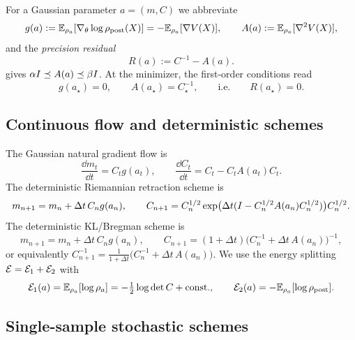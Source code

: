 For a Gaussian parameter $a=(m,C)$ we abbreviate
\[
    g(a):=\mathbb{E}_{\rho_a}[\nabla_\theta\log\rho_{\mathrm{post}}(X)]
    =-\mathbb{E}_{\rho_a}[\nabla V(X)],
    \qquad
    A(a):=\mathbb{E}_{\rho_a}[\nabla^2V(X)],
\]
and the \emph{precision residual}
\[
    R(a):=C^{-1}-A(a).
\]
 gives $\alpha I\preceq A(a)\preceq\beta I$. At the
minimizer, the first-order conditions read
\begin{equation}
\label{eq:first-order}
    g(a_\star)=0,
    \qquad
    A(a_\star)=C_\star^{-1},
    \qquad\text{i.e.}\qquad
    R(a_\star)=0 .
\end{equation}

\subsection{Continuous flow and deterministic schemes}

The Gaussian natural gradient flow is
\begin{equation}
\label{eq:NG-flow}
    \frac{\dd m_t}{\dd t}
    =
    C_tg(a_t),
    \qquad
    \frac{\dd C_t}{\dd t}
    =
    C_t-C_tA(a_t)C_t.
\end{equation}
The deterministic Riemannian retraction scheme is
\begin{equation}
\label{eq:Riem-det}
    m_{n+1}=m_n+\Delta t\,C_ng(a_n),
    \qquad
    C_{n+1}
    =
    C_n^{1/2}
    \exp\bigl(\Delta t(I-C_n^{1/2}A(a_n)C_n^{1/2})\bigr)
    C_n^{1/2}.
\end{equation}
The deterministic KL/Bregman scheme is
\begin{equation}
\label{eq:KL-det}
    m_{n+1}=m_n+\Delta t\,C_ng(a_n),
    \qquad
    C_{n+1}
    =(1+\Delta t)\bigl(C_n^{-1}+\Delta t\,A(a_n)\bigr)^{-1},
\end{equation}
or equivalently $C_{n+1}^{-1}=\tfrac1{1+\Delta t}\bigl(C_n^{-1}+\Delta t\,A(a_n)\bigr)$.
We use the energy splitting $\mathcal{E}=\mathcal{E}_1+\mathcal{E}_2$ with
\[
    \mathcal{E}_1(a)=\mathbb{E}_{\rho_a}[\log\rho_a]=-\tfrac12\log\det C+\text{const.},
    \qquad
    \mathcal{E}_2(a)=-\mathbb{E}_{\rho_a}[\log\rho_{\mathrm{post}}].
\]

\subsection{Single-sample stochastic schemes}

